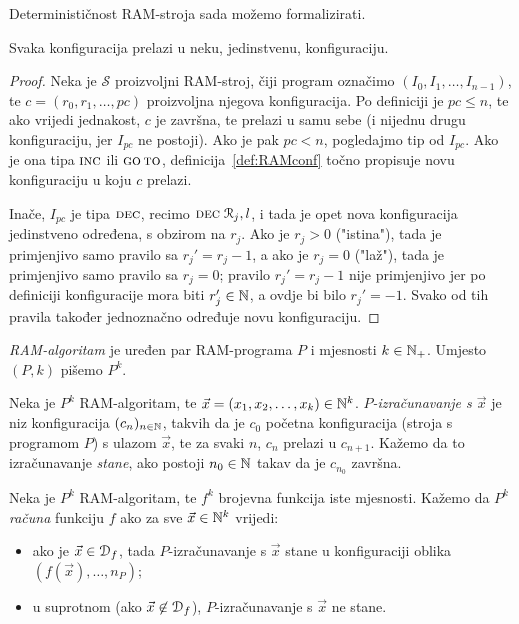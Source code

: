 Determinističnost RAM-stroja sada možemo formalizirati.

\begin{lema}[{name=[determinističnost RAM-stroja]}]\label{lema:ramdet}
Svaka konfiguracija prelazi u neku, jedinstvenu, konfiguraciju.
\end{lema}
\begin{proof}
Neka je $\mathcal S$ proizvoljni RAM-stroj, čiji program označimo  $(I_0, I_1,\dotsc, I_{n-1})$, te $c=(r_0,r_1,\dotsc,pc)$ proizvoljna njegova konfiguracija. Po definiciji je $pc\le n$, te ako vrijedi jednakost, $c$ je završna, te prelazi u samu sebe (i nijednu drugu konfiguraciju, jer $I_{pc}$ ne postoji). Ako je pak $pc<n$, pogledajmo tip od $I_{pc}$. Ako je ona tipa $\textsc{inc}$ ili $\textsc{go\,to}$, definicija~\ref{def:RAMconf} točno propisuje novu konfiguraciju u koju $c$ prelazi.

Inače, $I_{pc}$ je tipa $\textsc{dec}$, recimo $\textsc{dec}\;\mathcal R_{j},l$, i tada je opet nova konfiguracija jedinstveno određena, s obzirom na $r_j$. Ako je $r_j>0$ ("istina"), tada je primjenjivo samo pravilo sa $r_j'=r_j-1$, a ako je $r_j=0$ ("laž"), tada je primjenjivo samo pravilo sa $r_j=0$; pravilo $r_j'=r_j-1$ nije primjenjivo jer po definiciji konfiguracije mora biti $r_j'\in{\mathbb N}$, a ovdje bi bilo $r_j'=-1$. Svako od tih pravila također jednoznačno određuje novu konfiguraciju.
\end{proof}

\begin{definicija}[{name=[{RAM-algoritam, izračunavanje i računanje funkcije}]}]
\label{def:compute}
\emph{RAM-algoritam} je uređen par RAM-programa $P$ i mjesnosti $k\in{\mathbb N}_+$. Umjesto $(P,k)$ pišemo $P^k$.

Neka je $P^k$ RAM-algoritam, te $\vec x=(x_1,x_2,\dotsc,x_k)\in{\mathbb N}^k$. \emph{$P$\!-izračunavanje s $\vec x$} je niz konfiguracija $(c_n)_{n\in{\mathbb N}}$, takvih da je $c_0$ početna konfiguracija (stroja s programom $P$) s ulazom $\vec x$, te za svaki $n$, $c_n$ prelazi u $c_{n+1}$. Kažemo da to izračunavanje \emph{stane}, ako postoji $n_0\in{\mathbb N}$ takav da je $c_{n_0}$ završna.

Neka je $P^k$ RAM-algoritam, te $f^k$ brojevna funkcija iste mjesnosti. Kažemo da $P^k$
\emph{računa} funkciju $f$ ako za sve $\vec x\in{\mathbb N}^k$ vrijedi:
\begin{itemize}
    \item ako  je $\vec x\in \mathcal D_{f}$, tada $P$-izračunavanje s $\vec x$ stane u konfiguraciji oblika $(f(\vec x),\dotsc,n_P)$;
    \item u suprotnom (ako $\vec x\not\in\mathcal D_{f}$), $P$-izračunavanje s $\vec x$ ne stane.\qedhere
\end{itemize}
\end{definicija}

